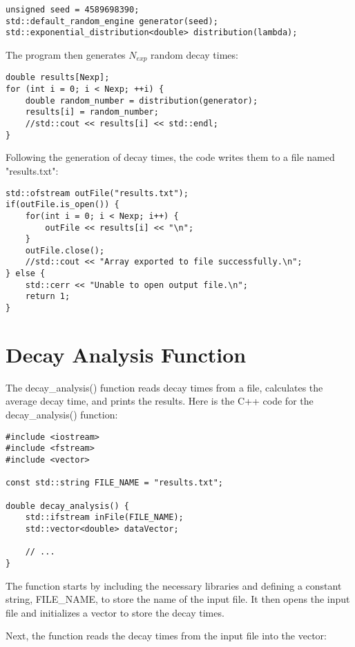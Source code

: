 \documentclass{article}
\begin{document}
\begin{verbatim}
unsigned seed = 4589698390;
std::default_random_engine generator(seed);
std::exponential_distribution<double> distribution(lambda);
\end{verbatim}

The program then generates $N_{exp}$ random decay times:

\begin{verbatim}
double results[Nexp];
for (int i = 0; i < Nexp; ++i) {
    double random_number = distribution(generator);
    results[i] = random_number;
    //std::cout << results[i] << std::endl;
}
\end{verbatim}

Following the generation of decay times, the code writes them to a file named "results.txt":

\begin{verbatim}
std::ofstream outFile("results.txt");
if(outFile.is_open()) {
    for(int i = 0; i < Nexp; i++) {
        outFile << results[i] << "\n";
    }
    outFile.close();
    //std::cout << "Array exported to file successfully.\n";
} else {
    std::cerr << "Unable to open output file.\n";
    return 1;
}
\end{verbatim}

\section{Decay Analysis Function}

The decay\_analysis() function reads decay times from a file, calculates the average decay time, and prints the results. Here is the C++ code for the decay\_analysis() function:

\begin{verbatim}
#include <iostream>
#include <fstream>
#include <vector>

const std::string FILE_NAME = "results.txt";

double decay_analysis() {
    std::ifstream inFile(FILE_NAME);
    std::vector<double> dataVector;

    // ...
}
\end{verbatim}

The function starts by including the necessary libraries and defining a constant string, FILE\_NAME, to store the name of the input file. It then opens the input file and initializes a vector to store the decay times.

Next, the function reads the decay times from the input file into the vector:
\end{document}
